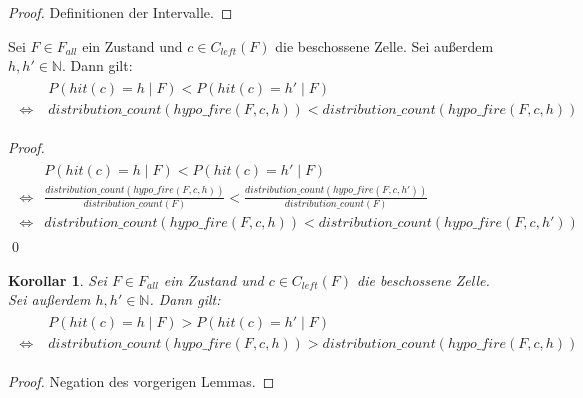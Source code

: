 \documentclass[a4paper,12pt]{llncs}
\numberwithin{equation}{section}
\newtheorem{korollar}{Korollar}
\begin{document}
\begin{proof}
Definitionen der Intervalle.
\end{proof}

\begin{lemma}
Sei $F\in F_{all}$ ein Zustand und $c \in C_{left}(F)$ die beschossene Zelle.
Sei außerdem $h,h' \in \mathbb{N}$.
Dann gilt:
\begin{align}
\begin{split}
&P(hit(c)=h \mid F) < P(hit(c)=h' \mid F) \\
\Leftrightarrow \; &distribution\_count(hypo\_fire(F, c, h)) < distribution\_count(hypo\_fire(F, c, h))
\nonumber
\end{split}
\end{align}
\end{lemma}

\begin{proof}
\begin{align}
\begin{split}
&P(hit(c)=h \mid F) < P(hit(c)=h' \mid F) \\
\Leftrightarrow
&\frac{distribution\_count(hypo\_fire(F,c, h))}{distribution\_count(F)} < \frac{distribution\_count(hypo\_fire(F,c, h'))}{distribution\_count(F)} \\
\Leftrightarrow
&distribution\_count(hypo\_fire(F,c, h)) < distribution\_count(hypo\_fire(F,c, h'))
\nonumber
\end{split}
\end{align}
\qed
\end{proof}

\begin{korollar}
Sei $F\in F_{all}$ ein Zustand und $c \in C_{left}(F)$ die beschossene Zelle.
Sei außerdem $h,h' \in \mathbb{N}$.
Dann gilt:
\begin{align}
\begin{split}
&P(hit(c)=h \mid F) > P(hit(c)=h' \mid F) \\
\Leftrightarrow \; &distribution\_count(hypo\_fire(F, c, h)) > distribution\_count(hypo\_fire(F, c, h))
\nonumber
\end{split}
\end{align}
\end{korollar}

\begin{proof}
Negation des vorgerigen Lemmas.
\end{proof}
\end{document}
